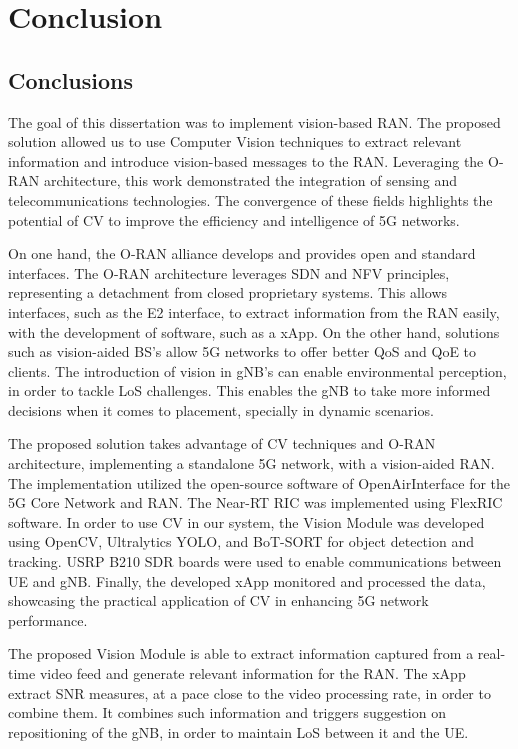 \chapter{Conclusion}\label{ch:conclusion}

\section{Conclusions}\label{sec:conclusions}
The goal of this dissertation was to implement vision-based RAN\@.
The proposed solution allowed us to use Computer Vision techniques to extract relevant information and introduce vision-based messages to the RAN\@.
Leveraging the O-RAN architecture, this work demonstrated the integration of sensing and telecommunications technologies.
The convergence of these fields highlights the potential of CV to improve the efficiency and intelligence of 5G networks.

On one hand, the O-RAN alliance develops and provides open and standard interfaces.
The O-RAN architecture leverages SDN and NFV principles, representing a detachment from closed proprietary systems.
This allows interfaces, such as the E2 interface, to extract information from the RAN easily, with the development of software, such as a xApp.
On the other hand, solutions such as vision-aided BS's allow 5G networks to offer better QoS and QoE to clients.
The introduction of vision in gNB's can enable environmental perception, in order to tackle LoS challenges.
This enables the gNB to take more informed decisions when it comes to placement, specially in dynamic scenarios.

The proposed solution takes advantage of CV techniques and O-RAN architecture, implementing a standalone 5G network, with a vision-aided RAN\@.
The implementation utilized the open-source software of OpenAirInterface for the 5G Core Network and RAN\@.
The Near-RT RIC was implemented using FlexRIC software.
In order to use CV in our system, the Vision Module was developed using OpenCV, Ultralytics YOLO, and BoT-SORT for object detection and tracking.
USRP B210 SDR boards were used to enable communications between UE and gNB\@.
Finally, the developed xApp monitored and processed the data, showcasing the practical application of CV in enhancing 5G network performance.

The proposed Vision Module is able to extract information captured from a real-time video feed and generate relevant information for the RAN\@.
The xApp extract SNR measures, at a pace close to the video processing rate, in order to combine them.
It combines such information and triggers suggestion on repositioning of the gNB, in order to maintain LoS between it and the UE\@.

